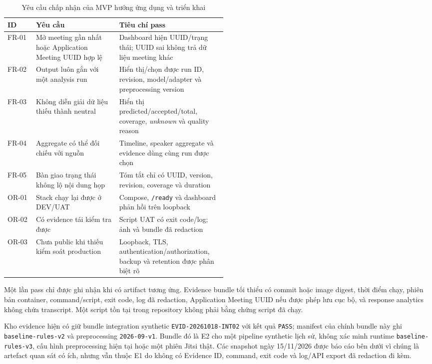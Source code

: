 \begin{table}[H]
\centering
\caption{Yêu cầu chấp nhận của MVP hướng ứng dụng và triển khai}
\label{tab:application-acceptance-requirements}
\begin{tabularx}{\linewidth}{p{0.13\linewidth}p{0.38\linewidth}X}
\toprule
ID & Yêu cầu & Tiêu chí pass \\ \midrule
FR-01 & Mở meeting gần nhất hoặc Application Meeting UUID hợp lệ & Dashboard hiện UUID/trạng thái; UUID sai không trả dữ liệu meeting khác \\
FR-02 & Output luôn gắn với một analysis run & Hiển thị/chọn được run ID, revision, model/adapter và preprocessing version \\
FR-03 & Không diễn giải dữ liệu thiếu thành neutral & Hiển thị predicted/accepted/total, coverage, \textit{unknown} và quality reason \\
FR-04 & Aggregate có thể đối chiếu với nguồn & Timeline, speaker aggregate và evidence dùng cùng run được chọn \\
FR-05 & Bàn giao trạng thái không lộ nội dung họp & Tóm tắt chỉ có UUID, version, revision, coverage và duration \\
OR-01 & Stack chạy lại được ở DEV/UAT & Compose, \texttt{/ready} và dashboard phản hồi trên loopback \\
OR-02 & Có evidence tái kiểm tra được & Script UAT có exit code/log; ảnh và bundle đã redaction \\
OR-03 & Chưa public khi thiếu kiểm soát production & Loopback, TLS, authentication/authorization, backup và retention được phân biệt rõ \\
\bottomrule
\end{tabularx}
\end{table}

Một lần pass chỉ được ghi nhận khi có artifact tương ứng. Evidence bundle tối thiểu có commit hoặc image digest, thời điểm chạy, phiên bản container, command/script, exit code, log đã redaction, Application Meeting UUID nếu được phép lưu cục bộ, và response analytics không chứa transcript. Một script tồn tại trong repository không phải bằng chứng script đã chạy.

Kho evidence hiện có giữ bundle integration synthetic \texttt{EVID-20261018-INT02} với kết quả \texttt{PASS}; manifest của chính bundle này ghi \texttt{baseline-rules-v2} và preprocessing \texttt{2026-09-v1}. Bundle đó là E2 cho một pipeline synthetic lịch sử, không xác minh runtime \texttt{baseline-rules-v3}, cấu hình preprocessing hiện tại hoặc một phiên Jitsi thật. Các snapshot ngày 15/11/2026 được báo cáo bên dưới vì chúng là artefact quan sát có ích, nhưng vẫn thuộc E1 do không có Evidence ID, command, exit code và log/API export đã redaction đi kèm.

